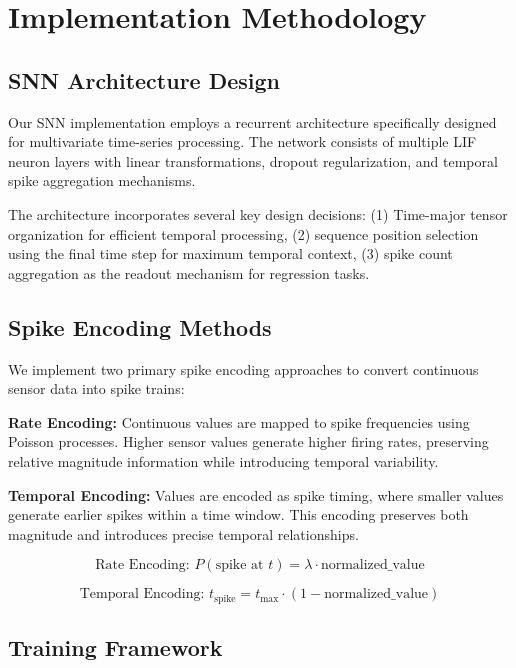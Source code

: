 \documentclass[11pt]{article}
\begin{document}
\section{Implementation Methodology}

\subsection{SNN Architecture Design}

Our SNN implementation employs a recurrent architecture specifically designed for multivariate time-series processing. The network consists of multiple LIF neuron layers with linear transformations, dropout regularization, and temporal spike aggregation mechanisms.



The architecture incorporates several key design decisions: (1) Time-major tensor organization for efficient temporal processing, (2) sequence position selection using the final time step for maximum temporal context, (3) spike count aggregation as the readout mechanism for regression tasks.

\subsection{Spike Encoding Methods}

We implement two primary spike encoding approaches to convert continuous sensor data into spike trains:

\textbf{Rate Encoding:} Continuous values are mapped to spike frequencies using Poisson processes. Higher sensor values generate higher firing rates, preserving relative magnitude information while introducing temporal variability.

\textbf{Temporal Encoding:} Values are encoded as spike timing, where smaller values generate earlier spikes within a time window. This encoding preserves both magnitude and introduces precise temporal relationships.

\begin{equation}
\text{Rate Encoding: } P(\text{spike at } t) = \lambda \cdot \text{normalized\_value}
\end{equation}

\begin{equation}
\text{Temporal Encoding: } t_{\text{spike}} = t_{\max} \cdot (1 - \text{normalized\_value})
\end{equation}

\subsection{Training Framework}
\end{document}
